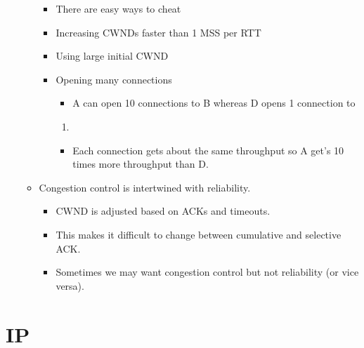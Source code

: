 \begin{itemize}
\begin{itemize}
    \begin{itemize}
    \tightlist
    \item
      There are easy ways to cheat
    \item
      Increasing CWNDs faster than 1 MSS per RTT
    \item
      Using large initial CWND
    \item
      Opening many connections

      \begin{itemize}
      \tightlist
      \item
        A can open 10 connections to B whereas D opens 1 connection to
      \end{itemize}

      \begin{enumerate}
      \def\labelenumi{\Alph{enumi}.}
      \setcounter{enumi}{3}
      \item
      \end{enumerate}

      \begin{itemize}
      \tightlist
      \item
        Each connection gets about the same throughput so A get's 10
        times more throughput than D.
      \end{itemize}
    \end{itemize}
  \item
    Congestion control is intertwined with reliability.

    \begin{itemize}
    \tightlist
    \item
      CWND is adjusted based on ACKs and timeouts.
    \item
      This makes it difficult to change between cumulative and selective
      ACK.
    \item
      Sometimes we may want congestion control but not reliability (or
      vice versa).
    \end{itemize}
  \end{itemize}
\end{itemize}

\hypertarget{ip}{%
\section{IP}\label{ip}}

